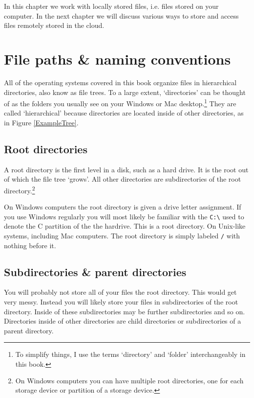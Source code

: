 In this chapter we work with locally stored files, i.e. files stored on your computer. In the next chapter we will discuss various ways to store and access files remotely stored in the cloud.


\section{File paths \& naming conventions}

All of the operating systems covered in this book organize files in hierarchical directories, also know as file trees. To a large extent, `directories' can be thought of as the folders you usually see on your Windows or Mac desktop.\footnote{To simplify things, I use the terms `directory' and `folder' interchangeably in this book.} They are called `hierarchical' because directories are located inside of other directories, as in Figure \ref{ExampleTree}. 

\subsection{Root directories}

A root directory is the first level in a disk, such as a hard drive. It is the root out of which the file tree `grows'. All other directories are subdirectories of the root directory.\footnote{On Windows computers you can have multiple root directories, one for each storage device or partition of a storage device.}


On Windows computers the root directory is given a drive letter assignment. If you use Windows regularly you will most likely be familiar with the \texttt{C:\textbackslash{}} used to denote the C partition of the the hardrive. This is a root directory. On Unix-like systems, including Mac computers. The root directory is simply labeled \texttt{/} with nothing before it.

\subsection{Subdirectories \& parent directories}

You will probably not store all of your files  the root directory. This would get very messy. Instead you will likely store your files in subdirectories of the root directory. Inside of these subdirectories may be further subdirectories and so on.  Directories inside of other directories are child directories or subdirectories of a parent directory.

